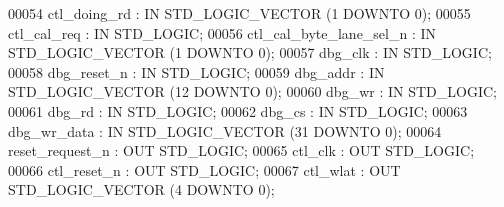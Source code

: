 \begin{DoxyCode}
{00054         \textcolor{vhdlchar}{ctl_doing_rd}    \textcolor{vhdlchar}{:} \textcolor{keywordflow}{IN} \textcolor{comment}{STD\_LOGIC\_VECTOR} \textcolor{vhdlchar}{(}\textcolor{vhdllogic}{}\textcolor{vhdllogic}{1} \textcolor{keywordflow}{DOWNTO} \textcolor{vhdllogic}{}\textcolor{vhdllogic}{0}\textcolor{vhdlchar}{)};
00055         \textcolor{vhdlchar}{ctl_cal_req} \textcolor{vhdlchar}{:} \textcolor{keywordflow}{IN} \textcolor{comment}{STD\_LOGIC};
00056         \textcolor{vhdlchar}{ctl_cal_byte_lane_sel_n} \textcolor{vhdlchar}{:} \textcolor{keywordflow}{IN} \textcolor{comment}{STD\_LOGIC\_VECTOR} \textcolor{vhdlchar}{(}\textcolor{vhdllogic}{}\textcolor{vhdllogic}{1} \textcolor{keywordflow}{DOWNTO} \textcolor{vhdllogic}{}\textcolor{vhdllogic}{0}\textcolor{vhdlchar}{)};
00057         \textcolor{vhdlchar}{dbg_clk} \textcolor{vhdlchar}{:} \textcolor{keywordflow}{IN} \textcolor{comment}{STD\_LOGIC};
00058         \textcolor{vhdlchar}{dbg_reset_n} \textcolor{vhdlchar}{:} \textcolor{keywordflow}{IN} \textcolor{comment}{STD\_LOGIC};
00059         \textcolor{vhdlchar}{dbg_addr}    \textcolor{vhdlchar}{:} \textcolor{keywordflow}{IN} \textcolor{comment}{STD\_LOGIC\_VECTOR} \textcolor{vhdlchar}{(}\textcolor{vhdllogic}{}\textcolor{vhdllogic}{12} \textcolor{keywordflow}{DOWNTO} \textcolor{vhdllogic}{}\textcolor{vhdllogic}{0}\textcolor{vhdlchar}{)};
00060         \textcolor{vhdlchar}{dbg_wr}  \textcolor{vhdlchar}{:} \textcolor{keywordflow}{IN} \textcolor{comment}{STD\_LOGIC};
00061         \textcolor{vhdlchar}{dbg_rd}  \textcolor{vhdlchar}{:} \textcolor{keywordflow}{IN} \textcolor{comment}{STD\_LOGIC};
00062         \textcolor{vhdlchar}{dbg_cs}  \textcolor{vhdlchar}{:} \textcolor{keywordflow}{IN} \textcolor{comment}{STD\_LOGIC};
00063         \textcolor{vhdlchar}{dbg_wr_data} \textcolor{vhdlchar}{:} \textcolor{keywordflow}{IN} \textcolor{comment}{STD\_LOGIC\_VECTOR} \textcolor{vhdlchar}{(}\textcolor{vhdllogic}{}\textcolor{vhdllogic}{31} \textcolor{keywordflow}{DOWNTO} \textcolor{vhdllogic}{}\textcolor{vhdllogic}{0}\textcolor{vhdlchar}{)};
00064         \textcolor{vhdlchar}{reset_request_n} \textcolor{vhdlchar}{:} \textcolor{keywordflow}{OUT} \textcolor{comment}{STD\_LOGIC};
00065         \textcolor{vhdlchar}{ctl_clk} \textcolor{vhdlchar}{:} \textcolor{keywordflow}{OUT} \textcolor{comment}{STD\_LOGIC};
00066         \textcolor{vhdlchar}{ctl_reset_n} \textcolor{vhdlchar}{:} \textcolor{keywordflow}{OUT} \textcolor{comment}{STD\_LOGIC};
00067         \textcolor{vhdlchar}{ctl_wlat}    \textcolor{vhdlchar}{:} \textcolor{keywordflow}{OUT} \textcolor{comment}{STD\_LOGIC\_VECTOR} \textcolor{vhdlchar}{(}\textcolor{vhdllogic}{}\textcolor{vhdllogic}{4} \textcolor{keywordflow}{DOWNTO} \textcolor{vhdllogic}{}\textcolor{vhdllogic}{0}\textcolor{vhdlchar}{)};
}
\end{DoxyCode}

